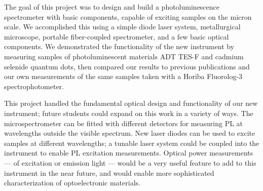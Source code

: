 The goal of this project was to design and build a photoluminescence spectrometer with basic components, capable of exciting samples on the micron scale. We accomplished this using a simple diode laser system, metallurgical microscope, portable fiber-coupled spectrometer, and a few basic optical components. We demonstrated the functionality of the new instrument by measuring samples of photoluminescent materials ADT TES-F and cadmium selenide quantum dots, then compared our results to previous publications and our own measurements of the same samples taken with a Horiba Fluorolog-3 spectrophotometer.

This project handled the fundamental optical design and functionality of our new instrument; future students could expand on this work in a variety of ways. The microspectrometer can be fitted with different detectors for measuring PL at wavelengths outside the visible spectrum. New laser diodes can be used to excite samples at different wavelengths; a tunable laser system could be coupled into the instrument to enable PL excitation measurements. Optical power measurements --- of excitation or emission light --- would be a very useful feature to add to this instrument in the near future, and would enable more sophisticated characterization of optoelectronic materials.